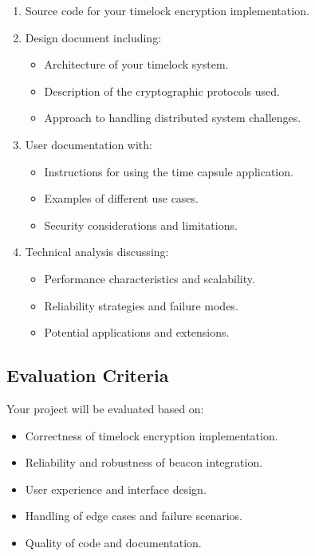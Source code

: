 \documentclass[10pt,a4paper,american]{exam}
\begin{document}
\begin{enumerate}
	\item Source code for your timelock encryption implementation.
	\item Design document including:
	      \begin{itemize}
		      \item Architecture of your timelock system.
		      \item Description of the cryptographic protocols used.
		      \item Approach to handling distributed system challenges.
	      \end{itemize}
	\item User documentation with:
	      \begin{itemize}
		      \item Instructions for using the time capsule application.
		      \item Examples of different use cases.
		      \item Security considerations and limitations.
	      \end{itemize}
	\item Technical analysis discussing:
	      \begin{itemize}
		      \item Performance characteristics and scalability.
		      \item Reliability strategies and failure modes.
		      \item Potential applications and extensions.
	      \end{itemize}
\end{enumerate}

\subsection*{Evaluation Criteria}
Your project will be evaluated based on:

\begin{itemize}
	\item Correctness of timelock encryption implementation.
	\item Reliability and robustness of beacon integration.
	\item User experience and interface design.
	\item Handling of edge cases and failure scenarios.
	\item Quality of code and documentation.
\end{itemize}
\end{document}
